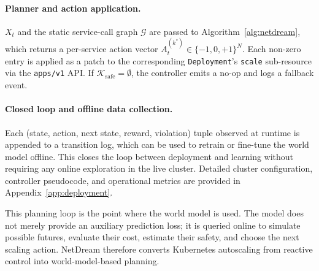\paragraph{Planner and action application.}
$X_t$ and the static service-call graph $\mathcal{G}$ are passed to
Algorithm~\ref{alg:netdream}, which returns a per-service action vector
$A^{(k^*)}_t \in\{-1,0,+1\}^N$. Each non-zero entry is applied as a
patch to the corresponding \texttt{Deployment}'s \texttt{scale}
sub-resource via the \texttt{apps/v1} API. If
$\mathcal{K}_{\mathrm{safe}}=\emptyset$, the controller emits a no-op
and logs a fallback event.

\paragraph{Closed loop and offline data collection.}
Each (state, action, next state, reward, violation) tuple observed at
runtime is appended to a transition log, which can be used to retrain
or fine-tune the world model offline. This closes the loop between
deployment and learning without requiring any online exploration in
the live cluster. Detailed cluster configuration, controller pseudocode,
and operational metrics are provided in
Appendix~\ref{app:deployment}.

This planning loop is the point where the world model is used. The model
does not merely provide an auxiliary prediction loss; it is queried
online to simulate possible futures, evaluate their cost, estimate their
safety, and choose the next scaling action. NetDream therefore converts
Kubernetes autoscaling from reactive control into world-model-based
planning.

